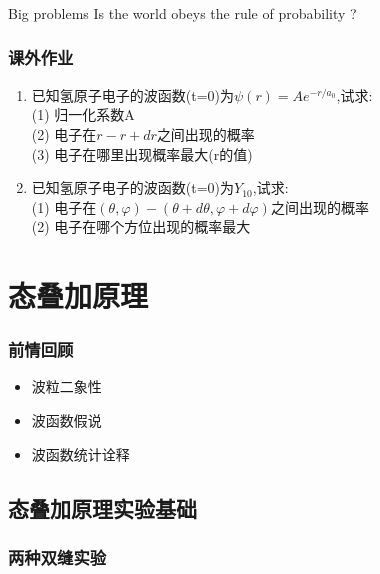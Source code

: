 \begin{frame}
    \frametitle{}
    \begin{atcbox}{Big problems}
        Is the world obeys the rule of probability ?
    \end{atcbox}
 \end{frame}
 \begin{frame}
     \frametitle{课外作业}
     \begin{enumerate}
        \item 已知氢原子电子的波函数(t=0)为$\psi(r)=Ae^{-r/a_0} $,试求:\\
               (1) 归一化系数A \\
               (2) 电子在$r-r+dr$之间出现的概率\\
               (3) 电子在哪里出现概率最大(r的值) 
        \item 已知氢原子电子的波函数(t=0)为$ Y_{10} $,试求:\\
                (1) 电子在$(\theta, \varphi) -(\theta + d \theta, \varphi + d \varphi)$之间出现的概率\\
                (2) 电子在哪个方位出现的概率最大 
     \end{enumerate}
 \end{frame}

 \section{态叠加原理}

 \begin{frame}
     \frametitle{前情回顾}
     \begin{itemize}
          \item 波粒二象性
          \item 波函数假说
          \item 波函数统计诠释
     \end{itemize}
 \end{frame}  
 
 \subsection{态叠加原理实验基础}
 
 \begin{frame}
     \frametitle{两种双缝实验}
         \begin{figure}
             \centering
         \end{figure}
     \setcounter{subfigure}{0}
 \end{frame}
 

